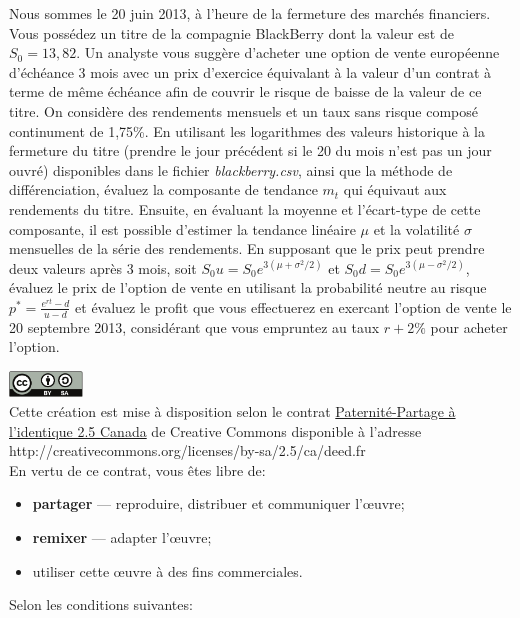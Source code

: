 \documentclass[11pt,english,francais]{article}
\begin{document}
Nous sommes le 20 juin 2013, à l'heure de la fermeture des marchés
financiers. Vous possédez un titre de la compagnie BlackBerry dont la
valeur est de $S_0 = 13,82$. Un analyste vous suggère d'acheter une
option de vente européenne d'échéance 3 mois avec un prix d'exercice
équivalant à la valeur d'un contrat à terme de même échéance afin de
couvrir le risque de baisse de la valeur de ce titre. On considère des
rendements mensuels et un taux sans risque composé continument de
1,75\%.  En utilisant les logarithmes des valeurs historique à la
fermeture du titre (prendre le jour précédent si le 20 du mois n'est
pas un jour ouvré) disponibles dans le fichier \emph{blackberry.csv},
ainsi que la méthode de différenciation, évaluez la composante de
tendance $m_t$ qui équivaut aux rendements du titre. Ensuite, en
évaluant la moyenne et l'écart-type de cette composante, il est
possible d'estimer la tendance linéaire $\mu$ et la volatilité
$\sigma$ mensuelles de la série des rendements. En supposant que le
prix peut prendre deux valeurs après 3 mois, soit $S_0u = S_0
e^{3(\mu+\sigma^2/2)}$ et $S_0d = S_0 e^{3(\mu-\sigma^2/2)}$, évaluez
le prix de l'option de vente en utilisant la probabilité neutre au
risque $p^{*} = \frac{e^{rt}-d}{u-d}$ et évaluez le profit que vous
effectuerez en exercant l'option de vente le 20 septembre 2013,
considérant que vous empruntez au taux $r+2\%$ pour acheter l'option.

\clearpage

\includegraphics[height=7mm,keepaspectratio=true]{by-sa}\\%
Cette création est mise à disposition selon le contrat
\href{http://creativecommons.org/licenses/by-sa/2.5/ca/deed.fr}{%
  Paternité-Partage à l'identique 2.5 Canada} de Creative Commons
disponible à l'adresse \\
http://creativecommons.org/licenses/by-sa/2.5/ca/deed.fr \\
En vertu de ce contrat, vous êtes libre de:
\begin{itemize}
\item \textbf{partager} --- reproduire, distribuer et communiquer
  l'{\oe}uvre;
\item \textbf{remixer} --- adapter l'{\oe}uvre;
\item utiliser cette {\oe}uvre à des fins commerciales.
\end{itemize}
Selon les conditions suivantes:
\end{document}
